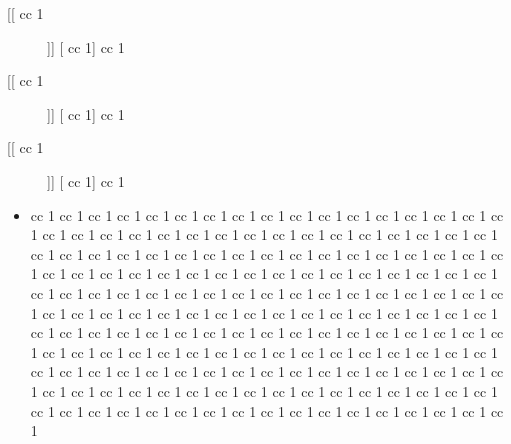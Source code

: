 \documentclass[11pt]{article}
\begin{document}
    \begin{description}
        \item[[[ cc 1]]] [ cc 1] cc 1
\item[[[ cc 1]]] [ cc 1] cc 1
\item[[[ cc 1]]] [ cc 1] cc 1
\end{description}

    \begin{itemize}
	\item  cc 1  cc 1  cc 1  cc 1  cc 1  cc 1  cc 1  cc 1  cc 1  cc 1  cc 1  cc 1  cc 1  cc 1  cc 1  cc 1  cc 1  cc 1  cc 1  cc 1  cc 1  cc 1  cc 1  cc 1  cc 1  cc 1  cc 1  cc 1  cc 1  cc 1  cc 1  cc 1  cc 1  cc 1  cc 1  cc 1  cc 1  cc 1  cc 1  cc 1  cc 1  cc 1  cc 1  cc 1  cc 1  cc 1  cc 1  cc 1  cc 1  cc 1  cc 1  cc 1  cc 1  cc 1  cc 1  cc 1  cc 1  cc 1  cc 1  cc 1  cc 1  cc 1  cc 1  cc 1  cc 1  cc 1  cc 1  cc 1  cc 1  cc 1  cc 1  cc 1  cc 1  cc 1  cc 1  cc 1  cc 1  cc 1  cc 1  cc 1  cc 1  cc 1  cc 1  cc 1  cc 1  cc 1  cc 1  cc 1  cc 1  cc 1  cc 1  cc 1  cc 1  cc 1  cc 1  cc 1  cc 1  cc 1  cc 1  cc 1  cc 1  cc 1  cc 1  cc 1  cc 1  cc 1  cc 1  cc 1  cc 1  cc 1  cc 1  cc 1  cc 1  cc 1  cc 1  cc 1  cc 1  cc 1  cc 1  cc 1  cc 1  cc 1  cc 1  cc 1  cc 1  cc 1  cc 1  cc 1  cc 1  cc 1  cc 1  cc 1  cc 1  cc 1  cc 1  cc 1  cc 1  cc 1  cc 1  cc 1  cc 1  cc 1  cc 1  cc 1  cc 1  cc 1  cc 1  cc 1  cc 1  cc 1  cc 1  cc 1  cc 1  cc 1  cc 1  cc 1  cc 1  cc 1  cc 1  cc 1  cc 1  cc 1  cc 1  cc 1  cc 1  cc 1  cc 1  cc 1  cc 1  cc 1  cc 1  cc 1  cc 1  cc 1  cc 1  cc 1  cc 1  cc 1  cc 1  cc 1  cc 1  cc 1

\end{itemize}
\end{document}
